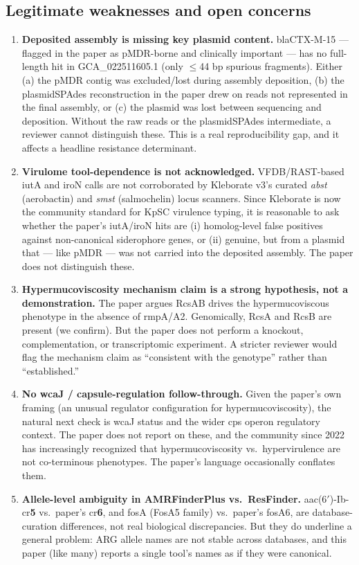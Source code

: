 \documentclass[11pt]{article}
\begin{document}
\subsection{Legitimate weaknesses and open concerns}
\begin{enumerate}[leftmargin=*]
\item \textbf{Deposited assembly is missing key plasmid content.} blaCTX-M-15 --- flagged in the paper as pMDR-borne and clinically important --- has no full-length hit in GCA\_022511605.1 (only $\leq$44 bp spurious fragments). Either (a) the pMDR contig was excluded/lost during assembly deposition, (b) the plasmidSPAdes reconstruction in the paper drew on reads not represented in the final assembly, or (c) the plasmid was lost between sequencing and deposition. Without the raw reads or the plasmidSPAdes intermediate, a reviewer cannot distinguish these. This is a real reproducibility gap, and it affects a headline resistance determinant.
\item \textbf{Virulome tool-dependence is not acknowledged.} VFDB/RAST-based iutA and iroN calls are not corroborated by Kleborate v3's curated \emph{abst} (aerobactin) and \emph{smst} (salmochelin) locus scanners. Since Kleborate is now the community standard for KpSC virulence typing, it is reasonable to ask whether the paper's iutA/iroN hits are (i) homolog-level false positives against non-canonical siderophore genes, or (ii) genuine, but from a plasmid that --- like pMDR --- was not carried into the deposited assembly. The paper does not distinguish these.
\item \textbf{Hypermucoviscosity mechanism claim is a strong hypothesis, not a demonstration.} The paper argues RcsAB drives the hypermucoviscous phenotype in the absence of rmpA/A2. Genomically, RcsA and RcsB are present (we confirm). But the paper does not perform a knockout, complementation, or transcriptomic experiment. A stricter reviewer would flag the mechanism claim as ``consistent with the genotype'' rather than ``established.''
\item \textbf{No wcaJ / capsule-regulation follow-through.} Given the paper's own framing (an unusual regulator configuration for hypermucoviscosity), the natural next check is wcaJ status and the wider cps operon regulatory context. The paper does not report on these, and the community since 2022 has increasingly recognized that hypermucoviscosity vs.\ hypervirulence are not co-terminous phenotypes. The paper's language occasionally conflates them.
\item \textbf{Allele-level ambiguity in AMRFinderPlus vs.\ ResFinder.} aac(6$'$)-Ib-cr\textbf{5} vs.\ paper's cr\textbf{6}, and fosA (FosA5 family) vs.\ paper's fosA6, are database-curation differences, not real biological discrepancies. But they do underline a general problem: ARG allele names are not stable across databases, and this paper (like many) reports a single tool's names as if they were canonical.

\end{enumerate}
\end{document}
